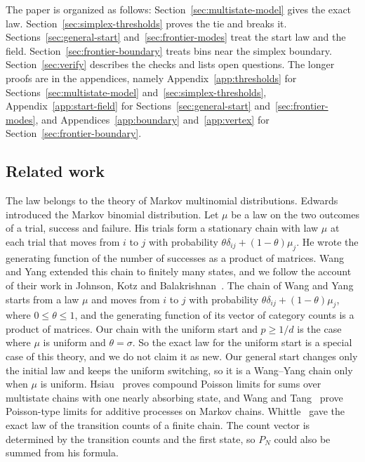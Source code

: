 \documentclass[11pt]{article}
\theoremstyle{definition}
\theoremstyle{remark}
\begin{document}
The paper is organized as follows: Section~\ref{sec:multistate-model} gives
the exact law. Section~\ref{sec:simplex-thresholds} proves the tie and breaks
it. Sections~\ref{sec:general-start} and~\ref{sec:frontier-modes} treat the
start law and the field. Section~\ref{sec:frontier-boundary} treats bins near
the simplex boundary. Section~\ref{sec:verify} describes the checks and lists
open questions. The longer proofs are in the appendices, namely
Appendix~\ref{app:thresholds} for Sections~\ref{sec:multistate-model}
and~\ref{sec:simplex-thresholds}, Appendix~\ref{app:start-field} for
Sections~\ref{sec:general-start} and~\ref{sec:frontier-modes}, and
Appendices~\ref{app:boundary} and~\ref{app:vertex} for
Section~\ref{sec:frontier-boundary}.

\subsection{Related work}\label{sec:related}

The law belongs to the theory of Markov multinomial distributions.
Edwards~\cite{edwards1960} introduced the Markov binomial distribution. Let
$\mu$ be a law on the two outcomes of a trial, success and failure. His trials
form a stationary chain with law $\mu$ at each trial that moves from $i$ to $j$
with probability $\theta\delta_{ij}+(1-\theta)\mu_j$. He wrote the generating
function of the number of successes as a product of matrices. Wang and
Yang extended this chain to finitely many states, and we follow the account
of their work in Johnson, Kotz and
Balakrishnan~\cite[Chapter~35, Section~13.2]{jkb1997}. The chain of Wang and
Yang starts from a law $\mu$ and moves from $i$ to $j$ with probability
$\theta\delta_{ij}+(1-\theta)\mu_j$, where $0\le\theta\le1$, and the generating
function of its vector of category counts is a product of matrices. Our chain
with the uniform start and $p\ge1/d$ is the case where $\mu$ is uniform and
$\theta=\sigma$. So the exact law for the uniform start is a special case of
this theory, and we do not claim it as new. Our general start changes only the
initial law and keeps the uniform switching, so it is a Wang--Yang chain only
when $\mu$ is uniform. Hsiau~\cite[Theorem~1]{hsiau1997} proves compound
Poisson limits for sums over multistate chains with one nearly absorbing state,
and Wang and Tang~\cite{wangtang2003} prove Poisson-type limits for additive
processes on Markov chains. Whittle~\cite[formula~(8)]{whittle1955} gave the
exact law of the transition counts of a finite chain. The count vector is
determined by the transition counts and the first state, so $P_N$ could also be
summed from his formula.
\end{document}
